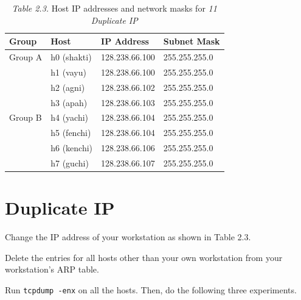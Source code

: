 \documentclass{../UTNetLab}
\begin{document}
    \begin{table}[H]
        \caption{\textit{Table 2.3.} Host IP addresses and network masks for \textit{11 Duplicate IP}}
        \vspace{5pt}
        \centering
        \large
        \begin{tabular}{ l l l l }
            \hline \hline
            Group & Host & IP Address & Subnet Mask \\
            \hline 
            Group A & h0 (shakti) & 128.238.66.100 & 255.255.255.0 \\
                    & h1 (vayu) & 128.238.66.100 & 255.255.255.0 \\
                    & h2 (agni) & 128.238.66.102 & 255.255.255.0 \\
                    & h3 (apah) & 128.238.66.103 & 255.255.255.0 \\
                    \hline
            Group B & h4 (yachi) & 128.238.66.104 & 255.255.255.0 \\
                    & h5 (fenchi) & 128.238.66.104 & 255.255.255.0 \\
                    & h6 (kenchi) & 128.238.66.106 & 255.255.255.0 \\
                    & h7 (guchi) & 128.238.66.107 & 255.255.255.0 \\
            \hline \hline
            \end{tabular}
    \end{table}

\section{Duplicate IP}
    Change the IP address of your workstation as shown in Table 2.3.

    Delete the entries for all hosts other than your own workstation from your workstation’s ARP table.

    Run \lstinline{tcpdump -enx} on all the hosts.
    Then, do the following three experiments.
\end{document}
